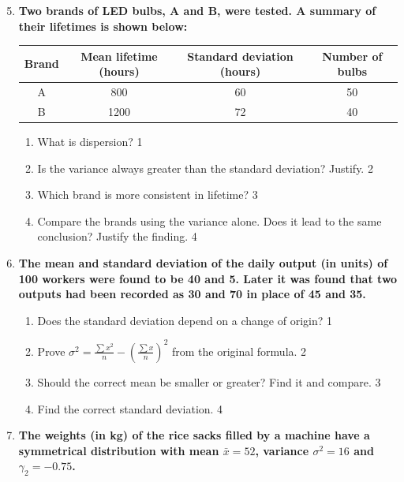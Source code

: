 \documentclass[12pt]{article}
\begin{document}
\begin{enumerate}
\setcounter{enumi}{4}

\item
\textbf{Two brands of LED bulbs, A and B, were tested. A summary of their lifetimes is shown below:}
\begin{center}
\begin{tabular}{c|c|c|c}
Brand & Mean lifetime (hours) & Standard deviation (hours) & Number of bulbs \\ \hline
A & 800 & 60 & 50 \\
B & 1200 & 72 & 40
\end{tabular}
\end{center}
\begin{enumerate}
  \item What is dispersion? \hfill 1
  \item Is the variance always greater than the standard deviation? Justify. \hfill 2
  \item Which brand is more consistent in lifetime? \hfill 3
  \item Compare the brands using the variance alone. Does it lead to the same conclusion? Justify the finding. \hfill 4
\end{enumerate}

\item
\textbf{The mean and standard deviation of the daily output (in units) of 100 workers were found to be 40 and 5. Later it was found that two outputs had been recorded as 30 and 70 in place of 45 and 35.}

\begin{enumerate}
  \item Does the standard deviation depend on a change of origin? \hfill 1
  \item Prove $\displaystyle \sigma^2 = \frac{\sum x^2}{n} - \left(\frac{\sum x}{n}\right)^2$ from the original formula. \hfill 2
  \item Should the correct mean be smaller or greater? Find it and compare. \hfill 3
  \item Find the correct standard deviation. \hfill 4
\end{enumerate}

\item
\textbf{The weights (in kg) of the rice sacks filled by a machine have a symmetrical distribution with mean $\bar x = 52$, variance $\sigma^2 = 16$ and $\gamma_2 = -0.75$.}


\end{enumerate}
\end{document}
